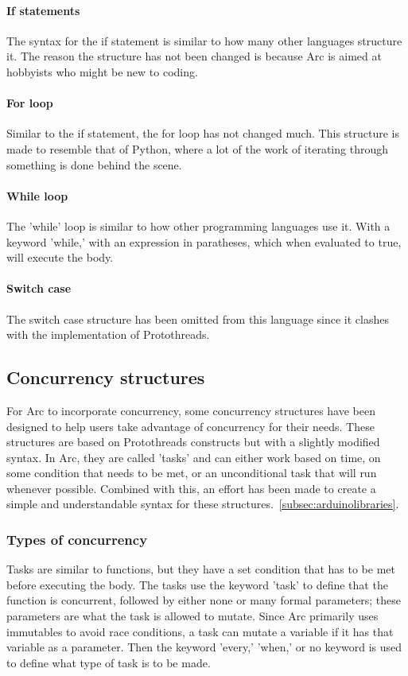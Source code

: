 \paragraph{If statements} The syntax for the if statement is similar to how many other languages structure it. The reason the structure has not been changed is because Arc is aimed at hobbyists who might be new to coding.

\paragraph{For loop} Similar to the if statement, the for loop has not changed much. This structure is made to resemble that of Python, where a lot of the work of iterating through something is done behind the scene.

\paragraph{While loop} The 'while' loop is similar to how other programming languages use it. With a keyword 'while,' with an expression in paratheses, which when evaluated to true, will execute the body.

\paragraph{Switch case} The switch case structure has been omitted from this language since it clashes with the implementation of Protothreads.

\subsection{Concurrency structures}\label{sec:concurrency structures}
For Arc to incorporate concurrency, some concurrency structures have been designed to help users take advantage of concurrency for their needs. These structures are based on Protothreads constructs but with a slightly modified syntax. In Arc, they are called 'tasks' and can either work based on time, on some condition that needs to be met, or an unconditional task that will run whenever possible. Combined with this, an effort has been made to create a simple and understandable syntax for these structures.~\ref{subsec:arduinolibraries}.


\subsubsection{Types of concurrency}
Tasks are similar to functions, but they have a set condition that has to be met before executing the body. The tasks use the keyword 'task' to define that the function is concurrent, followed by either none or many formal parameters; these parameters are what the task is allowed to mutate. Since Arc primarily uses immutables to avoid race conditions, a task can mutate a variable if it has that variable as a parameter. Then the keyword 'every,' 'when,' or no keyword is used to define what type of task is to be made.


